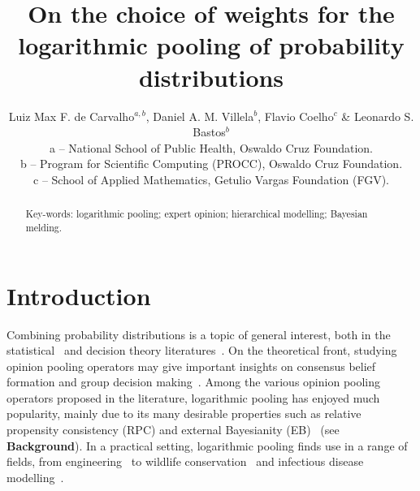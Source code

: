 \documentclass[a4paper, notitlepage, 10pt]{article}
\title{\vspace{-9ex}\centering \bf On the choice of weights for the logarithmic pooling of probability distributions}
\author{
Luiz Max F. de Carvalho$^{a,b}$, Daniel A. M. Villela$^b$, Flavio Coelho$^c$ \& Leonardo S. Bastos$^b$ \\
a -- National School of Public Health, Oswaldo Cruz Foundation.\\
b -- Program for Scientific Computing (PROCC), Oswaldo Cruz Foundation. \\
c -- School of Applied Mathematics, Getulio Vargas Foundation (FGV).
}
\begin{document}
\maketitle

\begin{abstract}


Key-words: logarithmic pooling; expert opinion; hierarchical modelling; Bayesian melding. 
\end{abstract}

\section{Introduction}
\label{sec:intro}

Combining probability distributions is a topic of general interest, both in the statistical~\citep{west1984, genest1986A, genest1986B} and decision theory literatures~\citep{genest1984,French1985,Guardoni2002}.
On the theoretical front, studying opinion pooling operators may give important insights on consensus belief formation and group decision making~\citep{west1984,genest1986B,Guardoni2002}.
Among the various opinion pooling operators proposed in the literature, logarithmic pooling has enjoyed much popularity, mainly due to its many desirable properties such as relative propensity consistency (RPC) and external Bayesianity (EB)~\citep{genest1986A} (see \textbf{Background}). 
In a practical setting, logarithmic pooling finds use in a range of fields, from engineering~\citep{lind1988, savchuk1994} to wildlife conservation~\citep{poole2000} and infectious disease modelling~\citep{Coelho2009}. 
\end{document}
